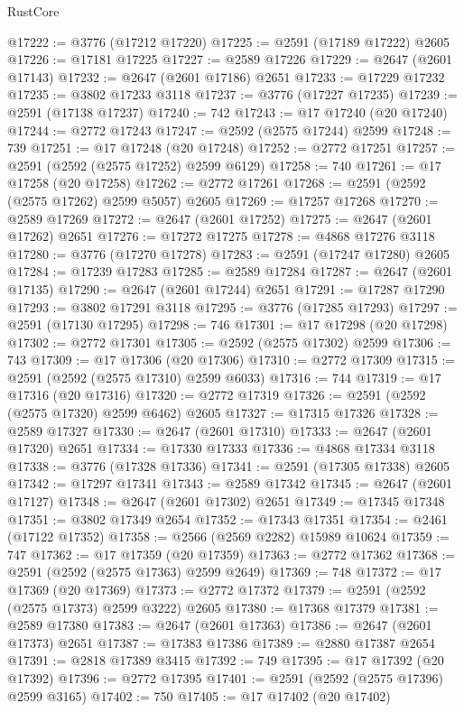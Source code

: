 \begin{lexlean}{RustCore}
\begin{coremodule}
@17222 := @3776 (@17212 @17220)
@17225 := @2591 (@17189 @17222) @2605
@17226 := @17181 @17225
@17227 := @2589 @17226
@17229 := @2647 (@2601 @17143)
@17232 := @2647 (@2601 @17186) @2651
@17233 := @17229 @17232
@17235 := @3802 @17233 @3118
@17237 := @3776 (@17227 @17235)
@17239 := @2591 (@17138 @17237)
@17240 := 742
@17243 := @17 @17240 (@20 @17240)
@17244 := @2772 @17243
@17247 := @2592 (@2575 @17244) @2599
@17248 := 739
@17251 := @17 @17248 (@20 @17248)
@17252 := @2772 @17251
@17257 := @2591 (@2592 (@2575 @17252) @2599 @6129)
@17258 := 740
@17261 := @17 @17258 (@20 @17258)
@17262 := @2772 @17261
@17268 := @2591 (@2592 (@2575 @17262) @2599 @5057) @2605
@17269 := @17257 @17268
@17270 := @2589 @17269
@17272 := @2647 (@2601 @17252)
@17275 := @2647 (@2601 @17262) @2651
@17276 := @17272 @17275
@17278 := @4868 @17276 @3118
@17280 := @3776 (@17270 @17278)
@17283 := @2591 (@17247 @17280) @2605
@17284 := @17239 @17283
@17285 := @2589 @17284
@17287 := @2647 (@2601 @17135)
@17290 := @2647 (@2601 @17244) @2651
@17291 := @17287 @17290
@17293 := @3802 @17291 @3118
@17295 := @3776 (@17285 @17293)
@17297 := @2591 (@17130 @17295)
@17298 := 746
@17301 := @17 @17298 (@20 @17298)
@17302 := @2772 @17301
@17305 := @2592 (@2575 @17302) @2599
@17306 := 743
@17309 := @17 @17306 (@20 @17306)
@17310 := @2772 @17309
@17315 := @2591 (@2592 (@2575 @17310) @2599 @6033)
@17316 := 744
@17319 := @17 @17316 (@20 @17316)
@17320 := @2772 @17319
@17326 := @2591 (@2592 (@2575 @17320) @2599 @6462) @2605
@17327 := @17315 @17326
@17328 := @2589 @17327
@17330 := @2647 (@2601 @17310)
@17333 := @2647 (@2601 @17320) @2651
@17334 := @17330 @17333
@17336 := @4868 @17334 @3118
@17338 := @3776 (@17328 @17336)
@17341 := @2591 (@17305 @17338) @2605
@17342 := @17297 @17341
@17343 := @2589 @17342
@17345 := @2647 (@2601 @17127)
@17348 := @2647 (@2601 @17302) @2651
@17349 := @17345 @17348
@17351 := @3802 @17349 @2654
@17352 := @17343 @17351
@17354 := @2461 (@17122 @17352)
@17358 := @2566 (@2569 @2282) @15989 @10624
@17359 := 747
@17362 := @17 @17359 (@20 @17359)
@17363 := @2772 @17362
@17368 := @2591 (@2592 (@2575 @17363) @2599 @2649)
@17369 := 748
@17372 := @17 @17369 (@20 @17369)
@17373 := @2772 @17372
@17379 := @2591 (@2592 (@2575 @17373) @2599 @3222) @2605
@17380 := @17368 @17379
@17381 := @2589 @17380
@17383 := @2647 (@2601 @17363)
@17386 := @2647 (@2601 @17373) @2651
@17387 := @17383 @17386
@17389 := @2880 @17387 @2654
@17391 := @2818 @17389 @3415
@17392 := 749
@17395 := @17 @17392 (@20 @17392)
@17396 := @2772 @17395
@17401 := @2591 (@2592 (@2575 @17396) @2599 @3165)
@17402 := 750
@17405 := @17 @17402 (@20 @17402)

\end{coremodule}
\end{lexlean}
